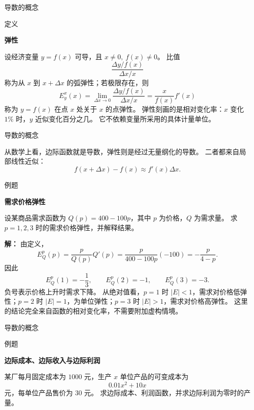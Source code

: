 \documentclass[aspectratio=169,10pt,fontset=fandol]{ctexbeamer}
\begin{document}
\begin{frame}[t,fragile]{导数的概念}
\normalsize
\begin{block}{定义}
{\normalsize
\textbf{弹性}\par

设经济变量 $y=f(x)$ 可导，且 $x\neq0,\ f(x)\neq0$。 比值
\[
\frac{\Delta y/f(x)}{\Delta x/x}
\]
称为从 $x$ 到 $x+\Delta x$ 的弧弹性；若极限存在，则
\[
E_y^x(x)=\lim_{\Delta x\to0}\frac{\Delta y/f(x)}{\Delta x/x}
=\frac{x}{f(x)}f'(x)
\]
称为 $y=f(x)$ 在点 $x$ 处关于 $x$ 的点弹性。 弹性刻画的是相对变化率：$x$ 变化 $1\%$ 时，$y$ 近似变化百分之几。 它不依赖变量所采用的具体计量单位。

}
\end{block}
\end{frame}
\begin{frame}[t,fragile]{导数的概念}
\small
{\small
从数学上看，边际函数就是导数，弹性则是经过无量纲化的导数。 二者都来自局部线性近似：
\[
f(x+\Delta x)-f(x)\approx f'(x)\Delta x.
\]


}
\begin{block}{例题}
{\small
\textbf{需求价格弹性}\par

设某商品需求函数为 $Q(p)=400-100p$，其中 $p$ 为价格，$Q$ 为需求量。 求 $p=1,2,3$ 时的需求价格弹性，并解释结果。

}
\end{block}
\pause
{\small
\textbf{解：}
由定义，
\[
E_Q^p(p)=\frac{p}{Q(p)}Q'(p)=\frac{p}{400-100p}(-100)=-\frac{p}{4-p}.
\]
因此
\[
E_Q^p(1)=-\frac13,\qquad E_Q^p(2)=-1,\qquad E_Q^p(3)=-3.
\]
负号表示价格上升时需求下降。 从绝对值看，$p=1$ 时 $|E|<1$，需求对价格低弹性；$p=2$ 时 $|E|=1$，为单位弹性；$p=3$ 时 $|E|>1$，需求对价格高弹性。 这里的结论完全来自函数的相对变化率，不需要附加虚构情境。

}
\end{frame}
\begin{frame}[t,fragile]{导数的概念}
\footnotesize
\begin{block}{例题}
{\footnotesize
\textbf{边际成本、边际收入与边际利润}\par

某厂每月固定成本为 $1000$ 元，生产 $x$ 单位产品的可变成本为
\[
0.01x^2+10x
\]
元，每单位产品售价为 $30$ 元。 求边际成本、利润函数，并求边际利润为零时的产量。

}
\end{block}
\end{frame}
\end{document}
